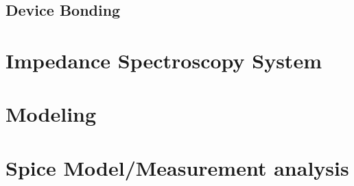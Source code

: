 \FloatBarrier

\subsection{Device Bonding}


\section{Impedance Spectroscopy System}


\section{Modeling}


\section{Spice Model/Measurement analysis}